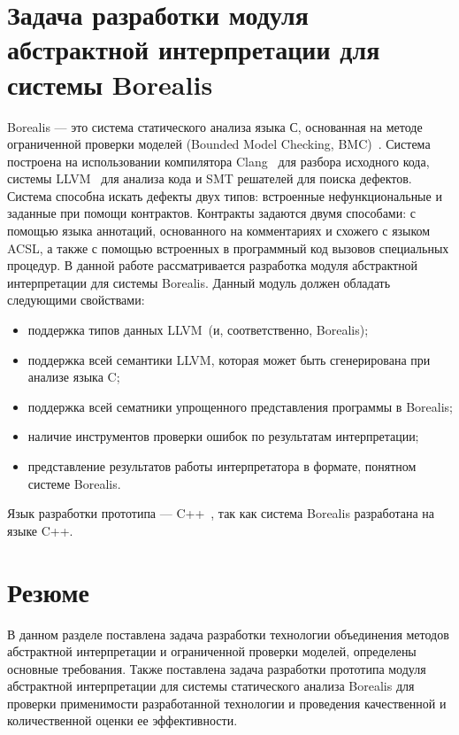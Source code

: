 \section{Задача разработки модуля абстрактной интерпретации для системы 
Borealis}
Borealis --- это система статического анализа языка С, основанная на методе 
ограниченной проверки моделей (Bounded Model Checking, BMC)~\cite{bmc}. Система 
построена на использовании компилятора Clang~\cite{clang} для разбора исходного 
кода, системы LLVM~\cite{llvm} для анализа кода и SMT решателей для поиска 
дефектов. Система способна искать дефекты двух типов: встроенные 
нефункциональные и заданные при помощи контрактов. Контракты задаются двумя 
способами: с помощью языка аннотаций, основанного на комментариях и схожего с 
языком ACSL, а также с помощью встроенных в программный код вызовов специальных 
процедур. В данной работе рассматривается разработка модуля абстрактной 
интерпретации для системы Borealis. Данный модуль должен обладать следующими
свойствами:
\begin{itemize}
\item поддержка типов данных LLVM~(и, соответственно, Borealis);
\item поддержка всей семантики LLVM, которая может быть сгенерирована при 
анализе языка C;
\item поддержка всей сематники упрощенного представления программы в Borealis;
\item наличие инструментов проверки ошибок по результатам интерпретации;
\item представление результатов работы интерпретатора в формате, понятном 
системе Borealis.
\end{itemize}

Язык разработки прототипа --- C++~\cite{languageC++}, так как система Borealis 
разработана на языке C++.

\section{Резюме}
В данном разделе поставлена задача разработки технологии объединения методов
абстрактной интерпретации и ограниченной проверки моделей, определены основные 
требования. Также поставлена задача разработки прототи­па модуля абстрактной
интерпретации для системы статического анализа Borealis для проверки 
применимости разработанной технологии и про­ведения качественной и 
количественной оценки ее эффективности.